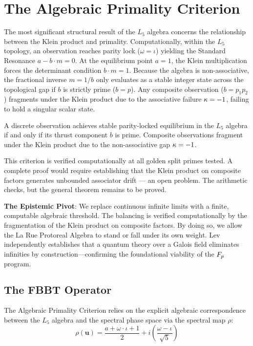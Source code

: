 \section{The Algebraic Primality Criterion}

The most significant structural result of the $L_5$ algebra concerns the relationship between the Klein product and primality. Computationally, within the $L_5$ topology, an observation reaches parity lock ($\omega = \iota$) yielding the Standard Resonance $a - b \cdot m = 0$. At the equilibrium point $a = 1$, the Klein multiplication forces the determinant condition $b \cdot m = 1$. Because the algebra is non-associative, the fractional inverse $m = 1/b$ only evaluates as a stable integer state across the topological gap if $b$ is strictly prime ($b = p$). Any composite observation ($b = p_1 p_2$) fragments under the Klein product due to the associative failure $\kappa = -1$, failing to hold a singular scalar state.

\begin{result}\label{res:primality}
A discrete observation achieves stable parity-locked equilibrium in the $L_5$ algebra if and only if its thrust component $b$ is prime. Composite observations fragment under the Klein product due to the non-associative gap $\kappa = -1$.
\end{result}

This criterion is verified computationally at all golden split primes tested. A complete proof would require establishing that the Klein product on composite factors generates unbounded associator drift --- an open problem. The arithmetic checks, but the general theorem remains to be proved.

\textbf{The Epistemic Pivot}: We replace continuous infinite limits with a finite, computable algebraic threshold. The balancing is verified computationally by the fragmentation of the Klein product on composite factors. By doing so, we allow the La Rue Protoreal Algebra to stand or fall under its own weight. Lev~\cite{lev-gfqt, lev-finite-math} independently establishes that a quantum theory over a Galois field eliminates infinities by construction---confirming the foundational viability of the $F_p$ program.

\subsection{The FBBT Operator}

The Algebraic Primality Criterion relies on the explicit algebraic correspondence between the $L_5$ algebra and the spectral phase space via the spectral map $\rho$:
\begin{equation}
\rho(\mathbf{u}) = \frac{a + \omega \cdot \iota + 1}{2} + i \left( \frac{\omega - \iota}{\sqrt{5}} \right)
\end{equation}


